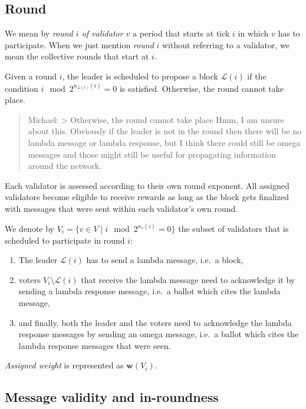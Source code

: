 \documentclass[12pt]{article}
\begin{document}
\subsection{Round}
\label{round}

We mean by \emph{round $i$ of validator $v$} a period that starts at tick $i$ in which $v$ has to participate. When we just mention \emph{round} $i$ without referring to a validator, we mean the collective rounds that start at $i$.

Given a round $i$, the leader is scheduled to propose a block $\mathcal{L}(i)$ if the condition $i\mod 2^{n_{\mathcal{L}(i)}(i)}=0$ is satisfied. Otherwise, the round cannot take place.

\begin{quote}
Michael: \textgreater{} Otherwise, the round cannot take place Hmm, I am unsure about this. Obviously if the leader is not in the round then there will be no lambda message or lambda response, but I think there could still be omega messages and those might still be useful for propagating information around the network.
\end{quote}

Each validator is assessed according to their own round exponent. All assigned validators become eligible to receive rewards as long as the block gets finalized with messages that were sent within each validator's own round.

We denote by $V_{i}=\{v\in V \mid i \mod 2^{n_v(i)} = 0\}$ the subset of validators that is scheduled to participate in round $i$:

\begin{enumerate}
\item
  The leader $\mathcal{L}(i)$ has to send a lambda message, i.e.~a block,
\item
  voters $V_i\setminus \mathcal{L}(i)$ that receive the lambda message need to acknowledge it by sending a lambda response message, i.e.~a ballot which cites the lambda message,
\item
  and finally, both the leader and the voters need to acknowledge the lambda response messages by sending an omega message, i.e.~a ballot which cites the lambda response messages that were seen.
\end{enumerate}

\emph{Assigned weight} is represented as $\boldsymbol{w}(V_i)$.

\subsection{Message validity and in-roundness}
\label{message-validity-and-in-roundness}
\end{document}
